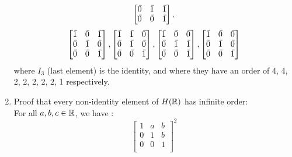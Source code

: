 \documentclass[12pt]{article}
\begin{document}
\begin{enumerate}[label=\textbf{\alph*.}]
\[\begin{bmatrix}
                \,\overline{\!{0}} & \,\overline{\!{1}} & \,\overline{\!{1}} \\
                \,\overline{\!{0}} & \,\overline{\!{0}} & \,\overline{\!{1}} \\
            \end{bmatrix}, \]
            \[ \begin{bmatrix}
                \olsi{1} & \olsi{0} & \olsi{1} \\
                \olsi{0} & \olsi{1} & \olsi{0} \\
                \olsi{0} & \olsi{0} & \olsi{1} \\
            \end{bmatrix},
            \begin{bmatrix}
                \olsi{1} & \olsi{1} & \olsi{0} \\
                \olsi{0} & \olsi{1} & \olsi{0} \\
                \olsi{0} & \olsi{0} & \olsi{1} \\
            \end{bmatrix},
            \begin{bmatrix}
                \olsi{1} & \olsi{0} & \olsi{0} \\
                \olsi{0} & \olsi{1} & \olsi{1} \\
                \olsi{0} & \olsi{0} & \olsi{1} \\
            \end{bmatrix},
            \begin{bmatrix}
                \olsi{1} & \olsi{0} & \olsi{0} \\
                \olsi{0} & \olsi{1} & \olsi{0} \\
                \olsi{0} & \olsi{0} & \olsi{1} \\
            \end{bmatrix} \]
            where $I_3$ (last element) is the identity, and where they
            have an order of 4, 4, 2, 2, 2, 2, 2, 1 respectively.
        \item
            Proof that every non-identity element of $H(\mathbb{R})$ has infinite
            order: \\
            For all $a, b, c \in \mathbb{R}$, we have :
            \[ \begin{bmatrix}
                1 & a & b \\
                0 & 1 & b \\
                0 & 0 & 1 \\
            \end{bmatrix}^2
\]
\end{enumerate}
\end{document}
